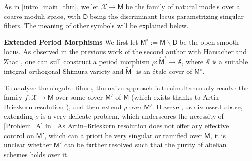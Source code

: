 \documentclass[11pt, letterpaper]{amsart}
\theoremstyle{plain}
\theoremstyle{definition}
\newcommand{\<}{\langle}
\renewcommand{\>}{\rangle}
\def\wt{\widetilde}
\newcommand{\shS}{\mathscr{S}}
\newcommand{\sfD}{\mathsf{D}}
\newcommand{\sfM}{\mathsf{M}}
\newcommand{\sX}{\mathcal{X}}
\begin{document}
As in \cref{intro_main_thm}, we let $\sX \to \sfM$ be the family of natural models over a coarse moduli space, with $\sfD$ being the discriminant locus parametrizing singular fibers. The meaning of other symbols will be explained below.

\textbf{Extended Period Morphisms}
We first let $\sfM^\circ := \sfM \smallsetminus \sfD$ be the open smooth locus. 
As observed in the previous work of the second author with Hamacher and Zhao \cite{HYZ}, one can still construct a period morphism $\rho : \wt{\sfM}^\circ \to \shS$, where $\shS$ is a suitable integral orthogonal Shimura variety and $\wt{\sfM}^\circ$ is an \'etale cover of $\sfM^\circ$.

To analyze the singular fibers, the naive approach is to simultaneously resolve the family $f:\sX\to \sfM$ over some cover $\sfM'$ of $\sfM$ (which exists thanks to Artin--Brieskorn resolution \cite{Artin-Res}), and then extend $\rho$ over $\sfM'$. 
However, as discussed above, extending $\rho$ is a very delicate problem, which underscores the necessity of \ref{Problem_A} in \cite{MPTate}. 
As Artin--Brieskorn resolution does not offer any effective control on $\sfM'$, which can a priori be very singular or ramified over $\sfM$, it is unclear whether $\sfM'$ can be further resolved such that the purity of abelian schemes holds over it.
\end{document}
